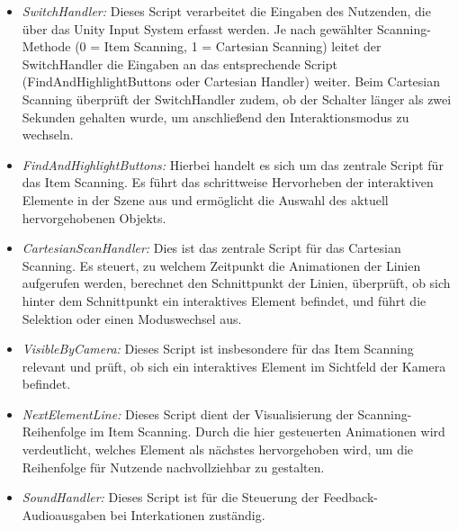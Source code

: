 \begin{itemize}
    \item \textit{SwitchHandler:}
    Dieses Script verarbeitet die Eingaben des Nutzenden, die über das Unity Input System erfasst werden. Je nach gewählter Scanning-Methode (0 = Item Scanning, 1 = Cartesian Scanning) leitet der SwitchHandler die Eingaben an das entsprechende Script (FindAndHighlightButtons oder Cartesian Handler) weiter. Beim Cartesian Scanning überprüft der SwitchHandler zudem, ob der Schalter länger als zwei Sekunden gehalten wurde, um anschließend den Interaktionsmodus zu wechseln.
    \item \textit{FindAndHighlightButtons:}
    Hierbei handelt es sich um das zentrale Script für das Item Scanning. Es führt das schrittweise Hervorheben der interaktiven Elemente in der Szene aus und ermöglicht die Auswahl des aktuell hervorgehobenen Objekts.
    \item \textit{CartesianScanHandler:} 
    Dies ist das zentrale Script für das Cartesian Scanning. Es steuert, zu welchem Zeitpunkt die Animationen der Linien aufgerufen werden, berechnet den Schnittpunkt der Linien, überprüft, ob sich hinter dem Schnittpunkt ein interaktives Element befindet, und führt die Selektion oder einen Moduswechsel aus. 
    \item \textit{VisibleByCamera:}
    Dieses Script ist insbesondere für das Item Scanning relevant und prüft, ob sich ein interaktives Element im Sichtfeld der Kamera befindet.
    \item \textit{NextElementLine:} 
    Dieses Script dient der Visualisierung der Scanning-Reihenfolge im Item Scanning. Durch die hier gesteuerten Animationen wird verdeutlicht, welches Element als nächstes hervorgehoben wird, um die Reihenfolge für Nutzende nachvollziehbar zu gestalten.
    \item \textit{SoundHandler:}
    Dieses Script ist für die Steuerung der Feedback-Audioausgaben bei Interkationen zuständig.
\end{itemize}

